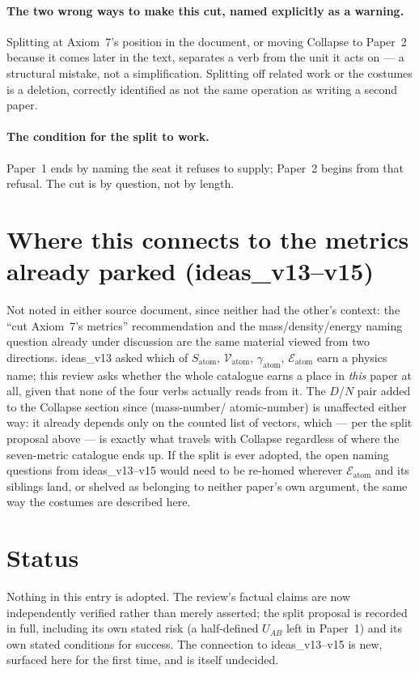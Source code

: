 \documentclass[11pt]{article}
\begin{document}
\paragraph{The two wrong ways to make this cut, named explicitly as
a warning.} Splitting at Axiom~7's position in the document, or
moving Collapse to Paper~2 because it comes later in the text,
separates a verb from the unit it acts on --- a structural mistake,
not a simplification. Splitting off related work or the costumes is
a deletion, correctly identified as not the same operation as
writing a second paper.

\paragraph{The condition for the split to work.} Paper~1 ends by
naming the seat it refuses to supply; Paper~2 begins from that
refusal. The cut is by question, not by length.

\section{Where this connects to the metrics already parked
(ideas\_v13--v15)}

Not noted in either source document, since neither had the other's
context: the ``cut Axiom~7's metrics'' recommendation and the
mass/density/energy naming question already under discussion are the
same material viewed from two directions. ideas\_v13 asked which of
$S_{\text{atom}}$, $\mathcal{V}_{\text{atom}}$, $\gamma_{\text{atom}}$,
$\mathcal{E}_{\text{atom}}$ earn a physics name; this review asks
whether the whole catalogue earns a place in \emph{this} paper at
all, given that none of the four verbs actually reads from it. The
$D$/$N$ pair added to the Collapse section since (mass-number/
atomic-number) is unaffected either way: it already depends only on
the counted list of vectors, which --- per the split proposal
above --- is exactly what travels with Collapse regardless of where
the seven-metric catalogue ends up. If the split is ever adopted, the
open naming questions from ideas\_v13--v15 would need to be
re-homed wherever $\mathcal{E}_{\text{atom}}$ and its siblings
land, or shelved as belonging to neither paper's own argument, the
same way the costumes are described here.

\section{Status}

Nothing in this entry is adopted. The review's factual claims are
now independently verified rather than merely asserted; the split
proposal is recorded in full, including its own stated risk (a
half-defined $U_{AB}$ left in Paper~1) and its own stated conditions
for success. The connection to ideas\_v13--v15 is new, surfaced
here for the first time, and is itself undecided.
\end{document}
